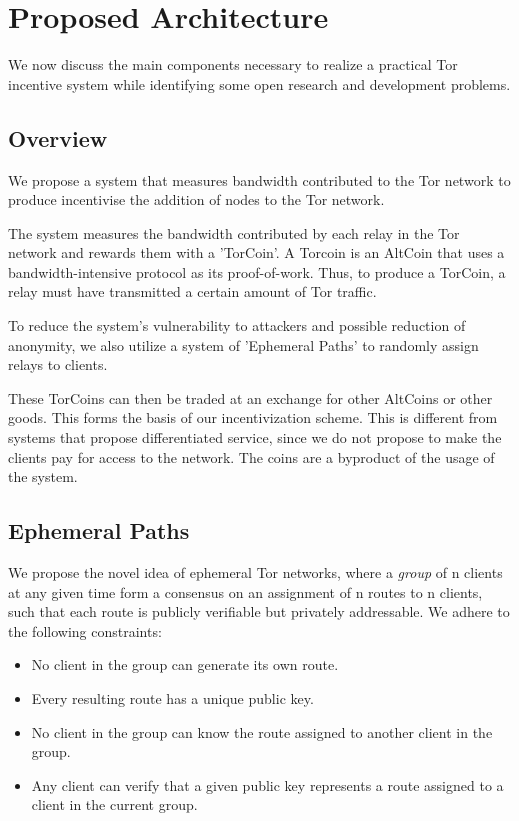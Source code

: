\section{Proposed Architecture} \label{arch}

We now discuss the main components necessary to realize a practical Tor
incentive system while identifying some open research and development problems.

\subsection{Overview}
We propose a system that measures bandwidth contributed to the Tor network to produce incentivise the addition of nodes to the Tor network.

The system measures the bandwidth contributed by each relay in the Tor network and rewards them with a 'TorCoin'. A Torcoin is an AltCoin that uses a bandwidth-intensive protocol as its proof-of-work. Thus, to produce a TorCoin, a relay must have transmitted a certain amount of Tor traffic.

To reduce the system's vulnerability to attackers and possible reduction of anonymity, we also utilize a system of 'Ephemeral Paths' to randomly assign relays to clients.

These TorCoins can then be traded at an exchange for other AltCoins or other goods. This forms the basis of our incentivization scheme. This is different from systems that propose differentiated service\cite{dovrolis1999case, dovrolis2002proportional}, since we do not propose to make the clients pay for access to the network. The coins are a byproduct of the usage of the system.

\subsection{Ephemeral Paths}
We propose the novel idea of ephemeral Tor networks, where a \textit{group} of n clients at any given time form a consensus on an assignment of n routes to n clients, such that each route is publicly verifiable but privately addressable. We adhere to the following constraints:
\begin{itemize}
  \item No client in the group can generate its own route.
  \item Every resulting route has a unique public key.
  \item No client in the group can know the route assigned to another client in the group.
  \item Any client can verify that a given public key represents a route assigned to a client in the current group.
\end{itemize}

